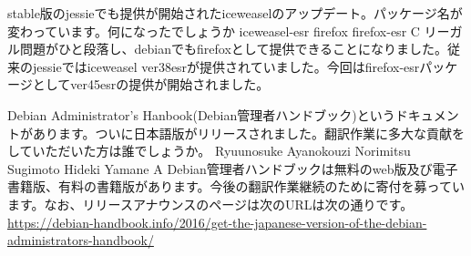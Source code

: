 %

\santaku
{stable版のjessieでも提供が開始されたiceweaselのアップデート。パッケージ名が変わっています。何になったでしょうか}
{iceweasel-esr}
{firefox}
{firefox-esr}
{C}
{リーガル問題がひと段落し、debianでもfirefoxとして提供できることになりました。従来のjessieではiceweasel ver38esrが提供されていました。今回はfirefox-esrパッケージとしてver45esrの提供が開始されました。}

\santaku
{Debian Administrator’s Hanbook(Debian管理者ハンドブック)というドキュメントがあります。ついに日本語版がリリースされました。翻訳作業に多大な貢献をしていただいた方は誰でしょうか。}
{Ryuunosuke Ayanokouzi}
{Norimitsu Sugimoto}
{Hideki Yamane}
{A}
{Debian管理者ハンドブックは無料のweb版及び電子書籍版、有料の書籍版があります。今後の翻訳作業継続のために寄付を募っています。なお、リリースアナウンスのページは次のURLは次の通りです。\url{https://debian-handbook.info/2016/get-the-japanese-version-of-the-debian-administrators-handbook/}}
